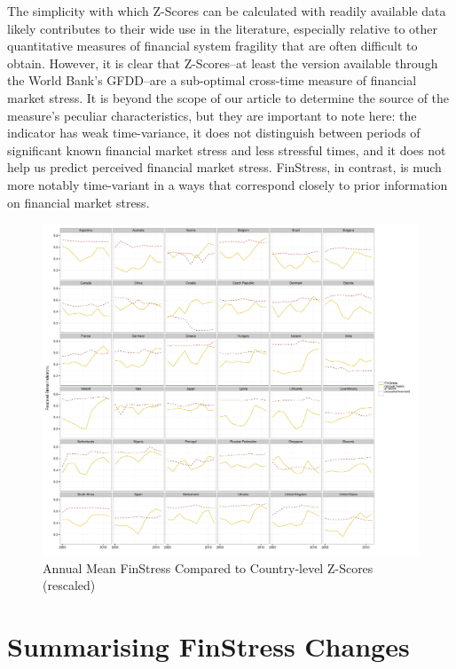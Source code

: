 \documentclass[]{article}
\begin{document}
The simplicity with which Z-Scores can be calculated with readily available data likely contributes to their wide use in the literature, especially relative to other quantitative measures of financial system fragility that are often difficult to obtain. However, it is clear that Z-Scores--at least the version available through the World Bank's GFDD--are a sub-optimal cross-time measure of financial market stress. It is beyond the scope of our article to determine the source of the measure's peculiar characteristics, but they are important to note here: the indicator has weak time-variance, it does not distinguish between periods of significant known financial market stress and less stressful times, and it does not help us predict perceived financial market stress. FinStress, in contrast, is much more notably time-variant in a ways that correspond closely to prior information on financial market stress.

\begin{figure}

    \caption{Annual Mean FinStress Compared to Country-level Z-Scores (rescaled)}
    \label{z_score}

    \begin{center}
        \includegraphics[scale=0.4]{figures/compare_to_z-score.pdf}
    \end{center}

\end{figure}

\section{Summarising FinStress Changes}
\end{document}
